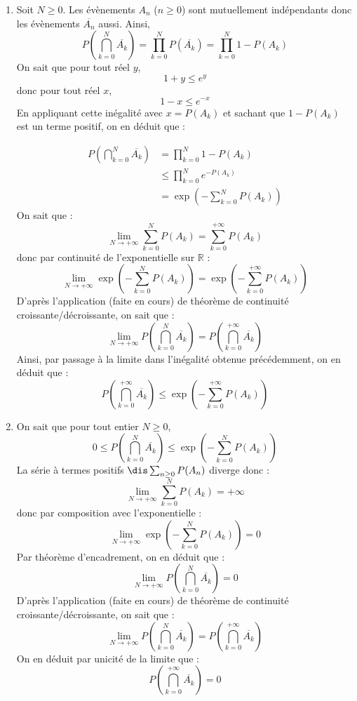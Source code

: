 \documentclass[a4paper,10pt]{report}
\begin{document}
\corr 
\begin{enumerate}
\item Soit $N \geq 0$. Les évènements $A_n$ ($n \geq 0$) sont mutuellement indépendants donc les évènements $\overline{A_n}$ aussi. Ainsi,
$$  P \left( \bigcap_{k=0}^N \overline{A_k} \right) = \prod_{k=0}^N P( \overline{A_k}) =  \prod_{k=0}^N 1- P(A_k) $$
On sait que pour tout réel $y$,
$$ 1+y \leq e^y$$
donc pour tout réel $x$,
$$ 1-x \leq e^{-x}$$
En appliquant cette inégalité avec $x=P(A_k)$ et sachant que $1-P(A_k)$ est un terme positif, on en déduit que :

\begin{align*}
P \left( \bigcap_{k=0}^N \overline{A_k} \right) & = \prod_{k=0}^N 1- P(A_k) \\
& \leq \prod_{k=0}^N e^{-P(A_k)} \\
& = \exp \left(- \sum_{k=0}^N P(A_k) \right)
\end{align*}
On sait que :
$$ \lim_{N \rightarrow + \infty} \sum_{k=0}^N P(A_k) = \sum_{k=0}^{+ \infty} P(A_k)$$
donc par continuité de l'exponentielle sur $\mathbb{R}$ :
$$ \lim_{N \rightarrow + \infty}\exp \left(- \sum_{k=0}^N P(A_k) \right) = \exp \left(- \sum_{k=0}^{+ \infty} P(A_k) \right)$$
D'après l'application (faite en cours) de théorème de continuité croissante/décroissante, on sait que :
$$ \lim_{N \rightarrow + \infty} P \left( \bigcap_{k=0}^N \overline{A_k} \right) = P \left( \bigcap_{k=0}^{+ \infty} \overline{A_k} \right)$$
Ainsi, par passage à la limite dans l'inégalité obtenue précédemment, on en déduit que :
$$ P \left( \bigcap_{k=0}^{+ \infty} \overline{A_k} \right) \leq \exp \left(- \sum_{k=0}^{+ \infty} P(A_k) \right)$$
\item On sait que pour tout entier $N \geq 0$,
$$ 0 \leq P \left( \bigcap_{k=0}^N \overline{A_k} \right) \leq \exp \left(- \sum_{k=0}^N P(A_k) \right)$$ 
La série à termes positifs $\dis \sum_{n \geq 0} P(A_n)$ diverge donc :
$$ \lim_{N \rightarrow + \infty} \sum_{k=0}^N P(A_k) = + \infty$$
donc par composition avec l'exponentielle :
$$ \lim_{N \rightarrow + \infty}\exp \left(- \sum_{k=0}^N P(A_k) \right) =0$$
Par théorème d'encadrement, on en déduit que :
$$ \lim_{N \rightarrow + \infty} P \left( \bigcap_{k=0}^N \overline{A_k} \right) = 0$$
D'après l'application (faite en cours) de théorème de continuité croissante/décroissante, on sait que :
$$ \lim_{N \rightarrow + \infty} P \left( \bigcap_{k=0}^N \overline{A_k} \right) = P \left( \bigcap_{k=0}^{+ \infty} \overline{A_k} \right)$$
On en déduit par unicité de la limite que :
$$ P \left( \bigcap_{k=0}^{+ \infty} \overline{A_k} \right) = 0$$
\end{enumerate}
\end{document}
